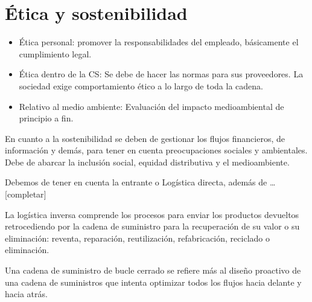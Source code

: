 \documentclass[12pt]{report} %
\providecommand{\tightlist}{%
  \setlength{\itemsep}{0pt}\setlength{\parskip}{0pt}}
\begin{document}
\hypertarget{uxe9tica-y-sostenibilidad}{%
\section{Ética y sostenibilidad}\label{uxe9tica-y-sostenibilidad}}

\begin{itemize}
\tightlist
\item
  Ética personal: promover la responsabilidades del empleado,
  básicamente el cumplimiento legal.
\item
  Ética dentro de la CS: Se debe de hacer las normas para sus
  proveedores. La sociedad exige comportamiento ético a lo largo de toda
  la cadena.
\item
  Relativo al medio ambiente: Evaluación del impacto medioambiental de
  principio a fin.
\end{itemize}

En cuanto a la sostenibilidad se deben de gestionar los flujos
financieros, de información y demás, para tener en cuenta preocupaciones
sociales y ambientales. Debe de abarcar la inclusión social, equidad
distributiva y el medioambiente.

Debemos de tener en cuenta la entrante o Logística directa, además de
\ldots{[}completar{]}

\begin{definicion}
La logística inversa comprende los procesos para enviar los productos devueltos retrocediendo por la cadena de suministro para la recuperación de su valor o su eliminación: reventa, reparación, reutilización, refabricación, reciclado o eliminación.
\end{definicion}

Una cadena de suministro de bucle cerrado se refiere más al diseño
proactivo de una cadena de suministros que intenta optimizar todos los
flujos hacia delante y hacia atrás.


\end{document}

